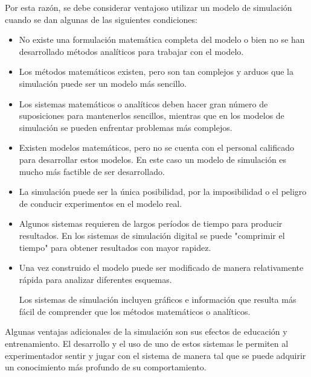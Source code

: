 Por esta razón, se debe considerar ventajoso utilizar un modelo de simulación cuando se dan algunas de las siguientes condiciones:

\begin{itemize}
\item No existe una formulación matemática completa del modelo o bien no se han desarrollado métodos analíticos para trabajar con el modelo.

\item Los métodos matemáticos existen, pero son tan complejos y arduos que la simulación puede ser un modelo más sencillo.

\item Los sistemas matemáticos o analíticos deben hacer gran número de suposiciones para mantenerlos sencillos, mientras que en los modelos de simulación se pueden enfrentar problemas más complejos.

\item Existen modelos matemáticos, pero no se cuenta con el personal calificado para desarrollar estos modelos. En este caso un modelo de simulación es mucho más factible de ser desarrollado.

\item La simulación puede ser la única posibilidad, por la imposibilidad o el peligro de conducir experimentos en el modelo real.

\item Algunos sistemas requieren de largos períodos de tiempo para producir resultados. En los sistemas de simulación digital se puede "comprimir el tiempo" para obtener resultados con mayor rapidez.

\item Una vez construido el modelo puede ser modificado de manera relativamente rápida para analizar diferentes esquemas.

\subitem Los sistemas de simulación incluyen gráficos e información que resulta más fácil de comprender que los métodos matemáticos o analíticos.

\end{itemize}

Algunas ventajas adicionales de la simulación son sus efectos de educación y entrenamiento. El desarrollo y el uso de uno de estos sistemas le permiten al experimentador sentir y jugar con el sistema de manera tal que se puede adquirir un conocimiento más profundo de su comportamiento.


